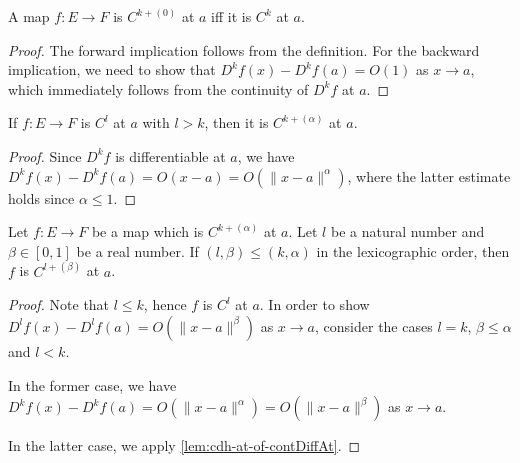 \begin{lemma}%
  \label{lem:cdh-at-zero}
  \leanok%
  A map \(f\colon E\to F\) is \(C^{k+(0)}\) at \(a\) iff it is \(C^{k}\) at \(a\).
\end{lemma}

\begin{proof}
  \leanok%
  The forward implication follows from the definition.
  For the backward implication,
  we need to show that \(D^{k}f(x) - D^{k}f(a)=O(1)\) as \(x\to a\),
  which immediately follows from the continuity of \(D^{k}f\) at \(a\).
\end{proof}

\begin{lemma}%
  \label{lem:cdh-at-of-contDiffAt}
  \leanok%
  If \(f\colon E\to F\) is \(C^{l}\) at \(a\) with \(l > k\),
  then it is \(C^{k+(\alpha)}\) at \(a\).
\end{lemma}
\begin{proof}
  \leanok%
  Since \(D^{k}f\) is differentiable at \(a\), we have \(D^{k}f(x)-D^{k}f(a)=O(x - a)=O(\|x - a\|^{\alpha})\),
  where the latter estimate holds since \(\alpha \le 1\).
\end{proof}

\begin{lemma}%
  \label{lem:cdh-at-mono}
  \leanok%
  Let \(f\colon E\to F\) be a map which is \(C^{k+(\alpha)}\) at \(a\).
  Let \(l\) be a natural number and \(\beta \in [0, 1]\) be a real number.
  If \((l, \beta) \le (k, \alpha)\) in the lexicographic order,
  then \(f\) is \(C^{l+(\beta)}\) at \(a\).
\end{lemma}

\begin{proof}
  \leanok%
  Note that \(l\le k\), hence \(f\) is \(C^{l}\) at \(a\).
  In order to show \(D^{l}f(x) - D^{l}f(a) = O(\|x - a\|^{\beta})\) as \(x\to a\),
  consider the cases \(l = k\), \(\beta \le \alpha\) and \(l < k\).

  In the former case, we have \(D^{k}f(x) - D^{k}f(a) = O\left(\|x - a\|^{\alpha}\right)=O\left(\|x - a\|^{\beta}\right)\) as \(x\to a\).

  In the latter case, we apply \autoref{lem:cdh-at-of-contDiffAt}.
\end{proof}

